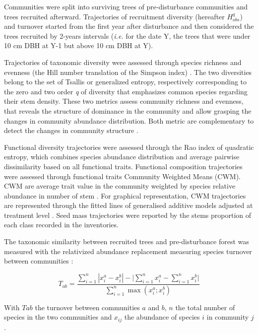\documentclass[fleqn,10pt]{ArtEcoFoG} %
\begin{document}
\color{red} Communities were split into surviving trees of
pre-disturbance communities and trees recruited afterward. Trajectories
of recruitment diversity (hereafter \(H^q_{obs}\)) and turnover started
from the first year after disturbance and then considered the trees
recruited by 2-years intervals (\emph{i.e.} for the date Y, the trees
that were under 10 cm DBH at Y-1 but above 10 cm DBH at Y).
\color{black}

Trajectories of taxonomic diversity were assessed through species
richness and evenness (the Hill number translation of the Simpson index)
\citep{Chao2015, Marcon2015}. The two diversities belong to the set of
Tsallis or generalized entropy, respectively corresponding to the zero
and two order \emph{q} of diversity that emphasizes common species
\color{red} regarding their stem density. These two metrics assess
community richness and evenness, that reveals the structure of dominance
in the community and allow grasping the changes in community abundance
distribution. Both metric are complementary to detect the changes in
community structure \citep{Magurran2004}. \color{black}

Functional diversity trajectories were assessed through the Rao index of
quadratic entropy, which combines species abundance distribution and
average pairwise dissimilarity based on all functional traits.
Functional composition trajectories were assessed through functional
traits Community Weighted Means (CWM). CWM are average trait value in
the community weighted by species relative abundance in number of stem
\citep{Diaz2007}. For graphical representation, CWM trajectories are
represented through the fitted lines of generalised additive models
adjusted at treatment level \citep{Wood2011}. Seed mass trajectories
were reported by the stems proportion of each class recorded in the
inventories.

\color{red} The taxonomic similarity between recruited trees and
pre-disturbance forest was measured with the relativized abundance
replacement measuring species turnover between communities
\citep{Podani2013a}:

\begin{equation}
T_{ab}=\frac{\sum_{i=1}^{n}|x_i^a - x_i^b| - \bigg| \sum_{i=1}^{n}{x_i^a} - \sum_{i=1}^{n}{x_i^b} \bigg|}{\sum_{i=1}^{n}\max{\left( x_i^a;x_i^b \right)}}
\label{eq:formNestedness}
\end{equation}

With \(Tab\) the turnover between communities \(a\) and \(b\), \(n\) the
total number of species in the two communities and \(x_{ij}\) the
abundance of species \(i\) in community \(j\).
\end{document}

